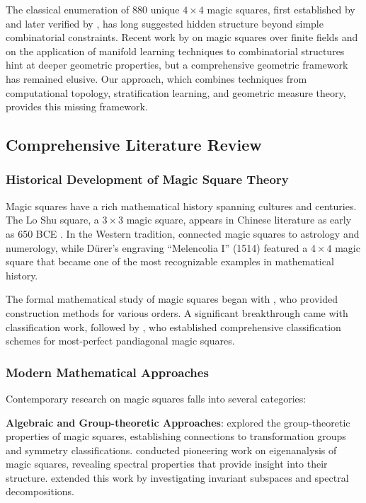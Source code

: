 The classical enumeration of 880 unique $4 \times 4$ magic squares, first established by \cite{frolov1890} and later verified by \cite{trump2001}, has long suggested hidden structure beyond simple combinatorial constraints. Recent work by \cite{hengeveld2012} on magic squares over finite fields and \cite{zhang2023} on the application of manifold learning techniques to combinatorial structures hint at deeper geometric properties, but a comprehensive geometric framework has remained elusive. Our approach, which combines techniques from computational topology, stratification learning, and geometric measure theory, provides this missing framework.

\subsection{Comprehensive Literature Review}

\subsubsection{Historical Development of Magic Square Theory}

Magic squares have a rich mathematical history spanning cultures and centuries. The Lo Shu square, a $3 \times 3$ magic square, appears in Chinese literature as early as 650 BCE \cite{cammann1960}. In the Western tradition, \cite{agrippa1533occulta} connected magic squares to astrology and numerology, while Dürer's engraving ``Melencolia I'' (1514) featured a $4 \times 4$ magic square that became one of the most recognizable examples in mathematical history.

The formal mathematical study of magic squares began with \cite{euler1782}, who provided construction methods for various orders. A significant breakthrough came with \cite{macmahon1921} classification work, followed by \cite{ollerenshaw1998}, who established comprehensive classification schemes for most-perfect pandiagonal magic squares.

\subsubsection{Modern Mathematical Approaches}

Contemporary research on magic squares falls into several categories:

\textbf{Algebraic and Group-theoretic Approaches}: \cite{mattingly2000} explored the group-theoretic properties of magic squares, establishing connections to transformation groups and symmetry classifications. \cite{loly2007} conducted pioneering work on eigenanalysis of magic squares, revealing spectral properties that provide insight into their structure. \cite{walter2012} extended this work by investigating invariant subspaces and spectral decompositions.

